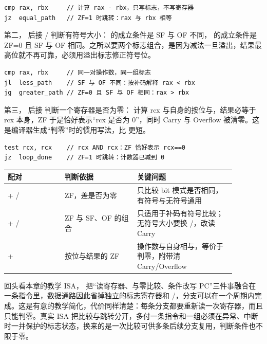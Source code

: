 \begin{lstlisting}
cmp rax, rbx     // 计算 rax - rbx，只写标志，不写寄存器
jz  equal_path   // ZF=1 时跳转：rax 与 rbx 相等
\end{lstlisting}

第二， 后接 / 判断有符号大小： 的成立条件是 SF 与 OF 不同， 的成立条件是 ZF=0 且 SF 与 OF 相同。之所以要两个标志组合，是因为减法一旦溢出，结果最高位就不再可靠，必须用溢出标志修正符号位。

\begin{lstlisting}
cmp rax, rbx     // 同一对操作数，同一组标志
jl  less_path    // SF 与 OF 不同：按补码解释 rax < rbx
jg  greater_path // ZF=0 且 SF 与 OF 相同：rax > rbx
\end{lstlisting}

第三， 后接  判断一个寄存器是否为零： 计算 rcx 与自身的按位与，结果必等于 rcx 本身，ZF 于是恰好表示“rcx 是否为 0”，同时 Carry 与 Overflow 被清零。这是编译器生成“判零”时的惯用写法，比  更短。

\begin{lstlisting}
test rcx, rcx    // rcx AND rcx：ZF 恰好表示 rcx==0
jz  loop_done    // ZF=1 时跳转：计数器已减到 0
\end{lstlisting}

\begin{longtable}{L{0.22\linewidth}L{0.28\linewidth}L{0.38\linewidth}}
\toprule
配对 & 判断依据 & 关键问题 \\
\midrule
{} + / & ZF，差是否为零 & 只比较 bit 模式是否相同，有符号与无符号通用 \\\tablerowrule
{} + / & ZF 与 SF、OF 的组合 & 只适用于补码有符号比较；无符号大小要换 /，改读 Carry \\\tablerowrule
{} +  & 按位与结果的 ZF & 操作数与自身相与，等价于判零，附带清 Carry/Overflow \\
\bottomrule
\end{longtable}

回头看本章的教学 ISA， 把“读寄存器、与零比较、条件改写 PC”三件事融合在一条指令里，数据通路因此省掉独立的标志寄存器和 /，分支可以在一个周期内完成。这是有意的教学简化，代价同样清楚：每条分支都要重新读一次寄存器，而且只能判零。真实 ISA 把比较与跳转分开，多付一条指令和一组必须在异常、中断时一并保护的标志状态，换来的是一次比较可供多条后续分支复用，判断条件也不限于零。

